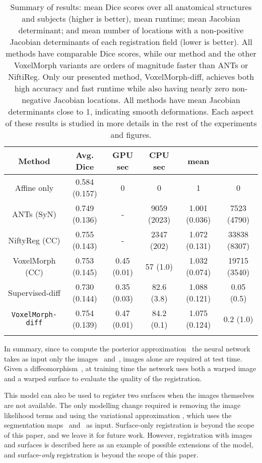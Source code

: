 \documentclass{article}
\begin{document}
\begin{table*}[h!]
	\small
	\centering
\color{blue}
	\begin{tabular}{c c c c c c}
		Method&Avg. Dice&GPU sec&CPU sec & mean  &     \\
		\hline
		Affine only&0.584 (0.157)&0 &0  & 1 & 0  \\
		ANTs (SyN) &0.749 (0.136)&-&9059 (2023) & 1.001 (0.036) & 7523 (4790)\\
		NiftyReg (CC) &0.755 (0.143)&-&2347 (202) & 1.072 (0.131)  & 33838 (8307) \\
		VoxelMorph (CC) & 0.753 (0.145) & 0.45 (0.01) & 57 (1.0) & 1.032 (0.074) & 19715 (3540)   \\ 
		Supervised-diff & 0.730 (0.144) & 0.35 (0.03) & 82.6 (3.8)        & 1.088 (0.121) & 0.05 (0.5)   \\ 
		\hline
\verb|VoxelMorph-diff| & 0.754 (0.139) & 0.47 (0.01)& 84.2 (0.1) & 1.075 (0.124) & 0.2 (1.0)   \\
		\hline  
		\vspace{-0.5cm}
	\end{tabular}
\caption{\color{blue} Summary of results: mean Dice scores over all anatomical structures and subjects (higher is better), mean runtime; mean Jacobian determinant; and mean number of locations with a non-positive Jacobian determinants of each registration field (lower is better). All methods have comparable Dice scores, while our method and the other VoxelMorph variants are orders of magnitude faster than ANTs or NiftiReg. Only our presented method, VoxelMorph-diff,
achieves both high accuracy and fast runtime while also having nearly zero non-negative Jacobian locations. All methods have mean Jacobian determinants close to 1, indicating smooth deformations.
Each aspect of these results is studied in more details in the rest of the experiments and figures.
	}
	\label{tbl:results}
\end{table*} 


In summary, since to compute the posterior approximation~ the neural network takes as input only the images~ and~, images alone are required at test time. Given a diffeomorphism~, at training time the network uses both a warped image and a warped surface to evaluate the quality of the registration. 

This model can also be used to register two surfaces when the images themselves are not available. The only modelling change required is removing the image likelihood terms and using the variational approximation , which uses the segmentation maps~ and~ as input. Surface-only registration is beyond the scope of this paper, and we leave it for future work. {\color{blue}However, registration with images and surfaces is described here as an example of possible extensions of the model, and surface-\textit{only} registration is beyond the scope of this paper. }
\end{document}
